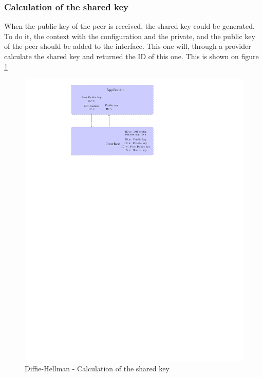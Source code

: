 \subsubsection*{Calculation of the shared key}

When the public key of the peer is received, the shared key could be generated.
To do it, the context with the configuration and the private, and the public key
of the peer should be added to the interface. This one will, through a provider
calculate the shared key and returned the ID of this one. This is shown on
figure \ref{fig:gci_dh_calc_key}

\begin{figure}[!ht]
\centering
\includegraphics[trim=8.5cm 20cm 10cm 0cm]{figures/gci_dh_calc_key.pdf}
\caption{Diffie-Hellman - Calculation of the shared key\newline}
\label{fig:gci_dh_calc_key}
\end{figure}


